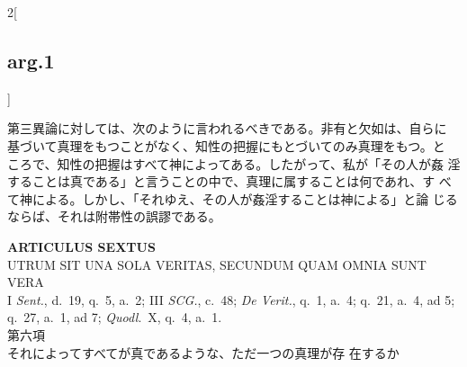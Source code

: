 \documentclass[paper=a4paper,fontsize=10pt,jafontsize=9pt,titlepage]{jlreq}
\begin{document}
\begin{paracol}{2}[\subsection{arg.1}]
\switchcolumn

第三異論に対しては、次のように言われるべきである。非有と欠如は、自らに
基づいて真理をもつことがなく、知性の把握にもとづいてのみ真理をもつ。と
ころで、知性の把握はすべて神によってある。したがって、私が「その人が姦
淫することは真である」と言うことの中で、真理に属することは何であれ、す
べて神による。しかし、「それゆえ、その人が姦淫することは神による」と論
じるならば、それは附帯性の誤謬である。

\end{paracol}
\newpage


{}
\setcounter{section}{6}
\setcounter{subsection}{0}
\begin{center}
 {\Large {\bfseries ARTICULUS SEXTUS}}\\
 {\large UTRUM SIT UNA SOLA VERITAS, SECUNDUM QUAM OMNIA SUNT VERA}\\
 {\footnotesize I {\itshape Sent.}, d.~19, q.~5, a.~2; III {\itshape
 SCG.}, c.~48; {\itshape De Verit.}, q.~1, a.~4; q.~21, a.~4, ad 5;
 q.~27, a.~1, ad 7; {\itshape Quodl}.~X, q.~4, a.~1.}\\
 {\Large 第六項\\それによってすべてが真であるような、ただ一つの真理が存
 在するか}
\end{center}
\end{document}
